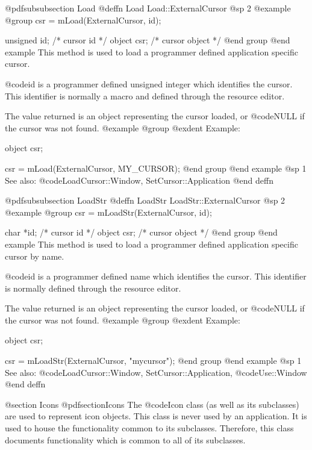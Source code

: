 @pdfsubsubsection {Load}
@deffn {Load} Load::ExternalCursor
@sp 2
@example
@group
csr = mLoad(ExternalCursor, id);

unsigned id;    /*  cursor id      */
object   csr;   /*  cursor object  */
@end group
@end example
This method is used to load a programmer defined application specific
cursor.

@code{id} is a programmer defined unsigned integer which identifies
the cursor.  This identifier is normally a macro and defined through the
resource editor.  

The value returned is an object representing the cursor loaded, or
@code{NULL} if the cursor was not found.
@example
@group
@exdent Example:

object  csr;

csr = mLoad(ExternalCursor, MY_CURSOR);
@end group
@end example
@sp 1
See also:  @code{LoadCursor::Window, SetCursor::Application}
@end deffn











@pdfsubsubsection {LoadStr}
@deffn {LoadStr} LoadStr::ExternalCursor
@sp 2
@example
@group
csr = mLoadStr(ExternalCursor, id);

char    *id;    /*  cursor id      */
object   csr;   /*  cursor object  */
@end group
@end example
This method is used to load a programmer defined application specific
cursor by name.

@code{id} is a programmer defined name which identifies the cursor.
This identifier is normally defined through the resource editor.

The value returned is an object representing the cursor loaded, or
@code{NULL} if the cursor was not found.
@example
@group
@exdent Example:

object  csr;

csr = mLoadStr(ExternalCursor, "mycursor");
@end group
@end example
@sp 1
See also:  @code{LoadCursor::Window, SetCursor::Application,}
        @code{Use::Window}
@end deffn




@section Icons
@pdfsection{Icons}
The @code{Icon} class (as well as its subclasses) are used to represent
icon objects.  This class is never used by an application.  It is used
to house the functionality common to its subclasses.  Therefore, this
class documents functionality which is common to all of its subclasses.

